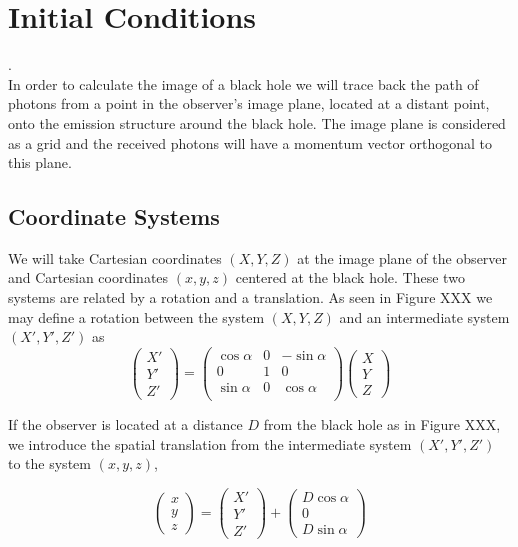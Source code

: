 
\chapter{Initial Conditions}.\\

In order to calculate the image of a black hole we will trace back the path of photons from a point in the observer's image plane, located at a distant point, onto the emission structure around the black hole. The image plane is considered as a grid and the received photons will have a momentum vector orthogonal to this plane.\\

\section{Coordinate Systems}
We will take Cartesian coordinates $(X,Y,Z)$ at the image plane of the observer and Cartesian coordinates $(x,y,z)$ centered at the black hole. These two systems are related  by a rotation and a translation. As seen in Figure XXX we may define a rotation between the system $(X,Y,Z)$ and an intermediate system $(X',Y',Z')$ as
\begin{equation}
\begin{pmatrix}
X' \\
Y' \\
Z'
\end{pmatrix} =
\begin{pmatrix}
\cos \alpha & 0 &-\sin\alpha \\
0 & 1 &0\\
\sin \alpha &  0 & \cos \alpha\\
\end{pmatrix} 
\begin{pmatrix}
X\\
Y\\
Z
\end{pmatrix}
\end{equation}

If the observer is located at a distance $D$ from the black hole as in Figure XXX, we introduce the spatial translation from the intermediate system $(X',Y',Z')$ to the system $(x,y,z)$,

\begin{equation}
\begin{pmatrix}
x \\
y \\
z
\end{pmatrix} =\begin{pmatrix}
X' \\
Y' \\
Z'
\end{pmatrix} +
\begin{pmatrix}
D \cos \alpha \\
0 \\
D \sin \alpha
\end{pmatrix}
\end{equation}

